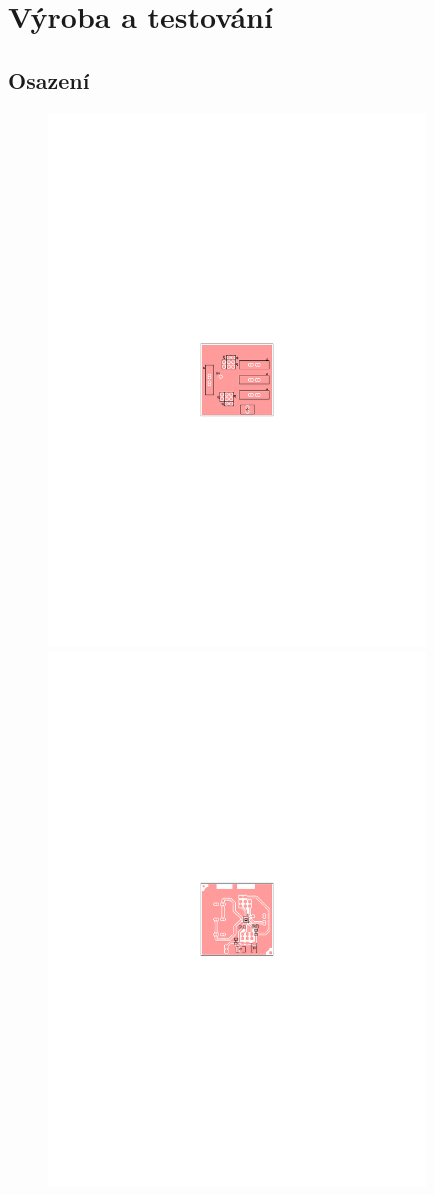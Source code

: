 \documentclass[12pt,a4paper,oneside]{article}
\begin{document}
\section{Výroba a testování}

\subsection{Osazení}

\begin{figure} [h!tbp]
  \centering
  \includegraphics[trim = 8cm 12cm 8cm 12cm, clip, width=10cm]{../../CAM_DOC/O1.pdf}
  \includegraphics[trim = 8cm 12cm 8cm 12cm, clip, width=10cm]{../../CAM_DOC/O2.pdf}

\end{figure}
\end{document}
